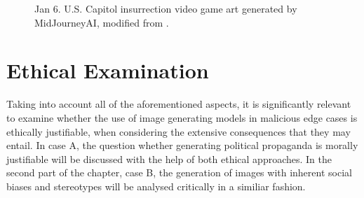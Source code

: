 \documentclass[10pt,twocolumn,twoside]{osajnl}
\begin{document}
\begin{figure}[htbp]
	\centering
	\caption{Jan 6. U.S. Capitol insurrection video game art generated by MidJourneyAI, modified from \cite{AIPropaganda}.}
	\label{capitol}
\end{figure}

\section{Ethical Examination}
Taking into account all of the aforementioned aspects, it is significantly relevant to examine whether the use of image generating models in malicious edge cases is ethically justifiable, when considering the extensive consequences
that they may entail. In case A, the question whether generating political propaganda is morally justifiable will be discussed with the help of both ethical approaches.
In the second part of the chapter, case B, the generation of images with inherent social biases and stereotypes will be analysed critically in a similiar fashion.
\end{document}
